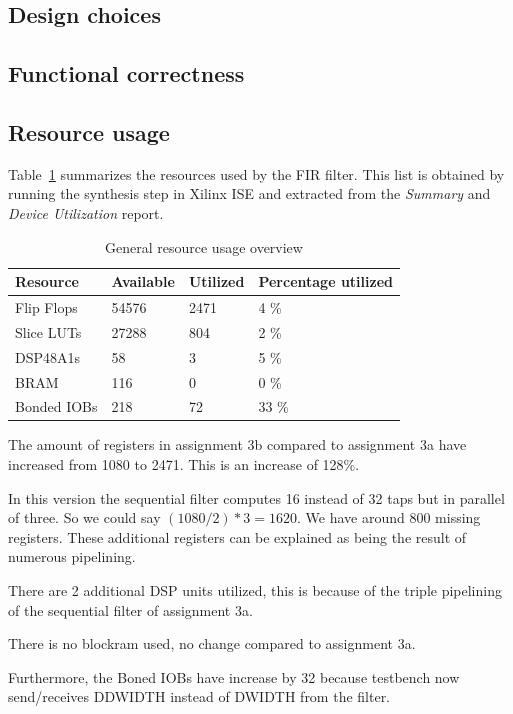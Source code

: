 \documentclass[a4paper,twoside,11pt, fleqn]{article}
\begin{document}
\subsection{Design choices}
\subsection{Functional correctness}
\subsection{Resource usage}
Table~\ref{tab:3busage} summarizes the resources used by the FIR filter. This list is obtained by running the synthesis step in Xilinx ISE and extracted from the \textit{Summary} and \textit{Device Utilization} report.

\begin{table}[h]
\begin{tabular}{|l|l|l|l|}
\hline
\textbf{Resource} & \textbf{Available} & \textbf{Utilized} & \textbf{Percentage utilized}\\
\hline
Flip Flops	& 54576 & 2471 	& 4 \%\\
Slice LUTs 	& 27288 & 804 	& 2 \%\\
DSP48A1s	& 58 	& 3 	& 5 \%\\
BRAM		& 116 	& 0 	& 0 \%\\
Bonded IOBs	& 218 	& 72 	& 33 \%\\
\hline
\end{tabular}
\caption{General resource usage overview}
\label{tab:3busage}
\end{table}

The amount of registers in assignment 3b compared to assignment 3a have increased from 1080 to 2471. This is an increase of 128\%. 

In this version the sequential filter computes 16 instead of 32 taps but in parallel of three. So we could say $(1080/2)*3=1620$. We have around 800 missing registers. These additional registers can be explained as being the result of numerous pipelining.

\smallskip

There are 2 additional DSP units utilized, this is because of the triple pipelining of the sequential filter of assignment 3a.

There is no blockram used, no change compared to assignment 3a.

Furthermore, the Boned IOBs have increase by 32 because testbench now send/receives DDWIDTH instead of DWIDTH from the filter.
\end{document}

